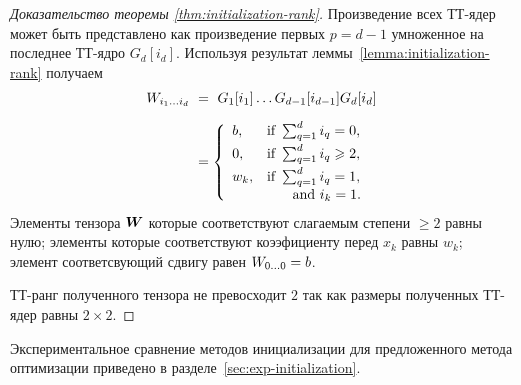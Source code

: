 \begin{proof}[Доказательство теоремы \ref{thm:initialization-rank}]
Произведение всех ТТ-ядер может быть представлено как произведение первых $p = d-1$ умноженное на последнее ТТ-ядро $G_d[i_d]$. Используя результат леммы~\ref{lemma:initialization-rank} получаем
\begin{equation*}
\begin{aligned}
\tensel{W}_{i_1 \ldots i_d} ~&=~ G_1[i_1] \ldots G_{d-1}[i_{d-1}] G_{d}[i_{d}]
	\\[0.2cm]
	&=\begin{cases*}
	    \begin{array}{ll}
	    b, & \text{if } \sum_{q=1}^d i_q = 0,\\[0.1cm]
	    0, & \text{if } \sum_{q=1}^d i_q \geq 2,\\[0.1cm]
	    w_k, & \text{if } \sum_{q=1}^d i_q = 1,\\
	                        &~~~~~\,\text{and}~i_k = 1.
	\end{array}
	\end{cases*}
\end{aligned}
\end{equation*}
Элементы тензора $\boldsymbol{W}$ которые соответствуют слагаемым степени $\geq 2$ равны нулю; элементы которые соответствуют коээфициенту перед $x_k$ равны $w_k$; элемент соответсвующий сдвигу равен $W_{0 \ldots 0} = b$.

ТТ-ранг полученного тензора не превосходит $2$ так как размеры полученных ТТ-ядер равны $2 \times 2$.
\end{proof}

Экспериментальное сравнение методов инициализации для предложенного метода оптимизации приведено в разделе~\ref{sec:exp-initialization}.

